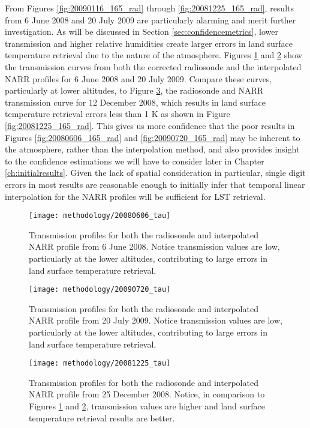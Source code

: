\documentclass{book}
\begin{document}
From Figures \ref{fig:20090116_165_rad} through \ref{fig:20081225_165_rad}, results from 6 June 2008 and 20 July 2009 are particularly alarming and merit further investigation.  As will be discussed in Section \ref{sec:confidencemetrics}, lower transmission and higher relative humidities create larger errors in land surface temperature retrieval due to the nature of the atmosphere.  Figures \ref{fig:20080606_tau} and \ref{fig:20090720_tau} show the transmission curves from both the corrected radiosonde and the interpolated NARR profiles for 6 June 2008 and 20 July 2009.  Compare these curves, particularly at lower altitudes, to Figure \ref{fig:20081225_tau}, the radiosonde and NARR transmission curve for 12 December 2008, which results in land surface temperature retrieval errors less than 1 K as shown in Figure \ref{fig:20081225_165_rad}.  This gives us more confidence that the poor results in Figures \ref{fig:20080606_165_rad} and \ref{fig:20090720_165_rad} may be inherent to the atmosphere, rather than the interpolation method, and also provides insight to the confidence estimations we will have to consider later in Chapter \ref{ch:initialresults}.  Given the lack of spatial consideration in particular, single digit errors in most results are reasonable enough to initially infer that temporal linear interpolation for the NARR profiles will be sufficient for LST retrieval.

\begin{figure}[H]
\centering
\texttt{[image: methodology/20080606\_tau]}
\caption{Transmission profiles for both the radiosonde and interpolated NARR profile from 6 June 2008.  Notice transmission values are low, particularly at the lower altitudes, contributing to large errors in land surface temperature retrieval.}
\label{fig:20080606_tau}
\end{figure}

\begin{figure}[H]
\centering
\texttt{[image: methodology/20090720\_tau]}
\caption{Transmission profiles for both the radiosonde and interpolated NARR profile from 20 July 2009.  Notice transmission values are low, particularly at the lower altitudes, contributing to large errors in land surface temperature retrieval.}
\label{fig:20090720_tau}
\end{figure}

\begin{figure}[H]
\centering
\texttt{[image: methodology/20081225\_tau]}
\caption{Transmission profiles for both the radiosonde and interpolated NARR profile from 25 December 2008.  Notice, in comparison to Figures \ref{fig:20080606_tau} and \ref{fig:20090720_tau}, transmission values are higher and land surface temperature retrieval results are better.}
\label{fig:20081225_tau}
\end{figure}
\end{document}
